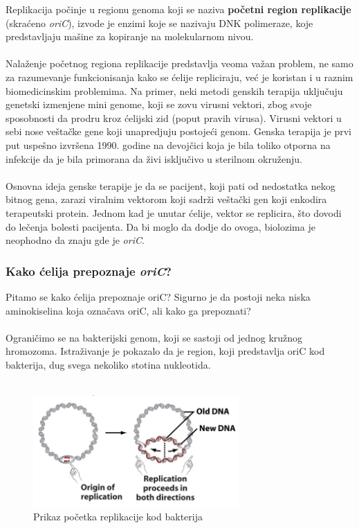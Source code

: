 Replikacija počinje u regionu genoma koji se naziva \textbf{početni region replikacije} (skraćeno \textit{oriC}), izvode je enzimi koje se nazivaju DNK polimeraze, koje predstavljaju mašine za kopiranje na molekularnom nivou.\\\\
Nalaženje početnog regiona replikacije predstavlja veoma važan problem, ne samo za razumevanje funkcionisanja kako se ćelije repliciraju, već je koristan i u raznim biomedicinskim problemima. Na primer, neki metodi genskih terapija uključuju genetski izmenjene mini genome, koji se zovu virusni vektori, zbog svoje sposobnosti da prodru kroz ćelijski zid (poput pravih virusa). Virusni vektori u sebi nose veštačke gene koji unapredjuju postojeći genom. Genska terapija je prvi put uspešno izvršena 1990. godine na devojčici koja je bila toliko otporna na infekcije da je bila primorana da živi isključivo u sterilnom okruženju.\\\\
Osnovna ideja genske terapije je da se pacijent, koji pati od nedostatka nekog bitnog gena, zarazi viralnim vektorom koji sadrži veštački gen koji enkodira terapeutski protein. Jednom kad je unutar ćelije, vektor se replicira, što dovodi do lečenja bolesti pacijenta. Da bi moglo da dodje do ovoga, biolozima je neophodno da znaju gde je \textit{oriC}.

\subsubsection{Kako ćelija prepoznaje \textit{oriC}?}
Pitamo se kako ćelija prepoznaje oriC? Sigurno je da postoji neka niska aminokiselina koja označava oriC, ali kako ga prepoznati?\\\\
Ograničimo se na bakterijski genom, koji se sastoji od jednog kružnog hromozoma. Istraživanje je pokazalo da je region, koji predstavlja oriC kod bakterija,
dug svega nekoliko stotina nukleotida.\\\\

\begin{figure}[h]
\caption{Prikaz početka replikacije kod bakterija}
\centering
\includegraphics[width=0.7\textwidth]{poglavlja/1/slike/Replikacija_bakterija.png}
\end{figure} 

